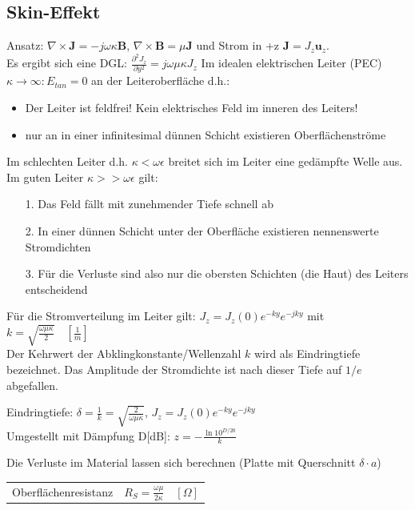 \documentclass[english]{latex4ei/latex4ei_sheet}
\begin{document}
\begin{sectionbox}
\subsection{Skin-Effekt}
Ansatz: $\nabla \times \mathbf{J} = -j\omega\kappa \mathbf{B}$, $\nabla\times\mathbf{B} = \mu \mathbf{J}$ und Strom in +z $\mathbf{J} = J_z \mathbf{u}_z$.\\
Es ergibt sich eine DGL: $\frac{\partial^2 J_z}{\partial y^2} = j\omega \mu \kappa J_z$
Im idealen elektrischen Leiter (PEC) $\kappa \to \infty: E_{tan} = 0$ an der Leiteroberfläche d.h.:\\
\begin{itemize}
	\item Der Leiter ist feldfrei! Kein elektrisches Feld im inneren des Leiters!
	\item nur an in einer infinitesimal dünnen Schicht existieren Oberflächenströme
\end{itemize}
Im schlechten Leiter d.h. $\kappa < \omega\epsilon$ breitet sich im Leiter eine gedämpfte Welle aus.\\
Im guten Leiter $\kappa >> \omega\epsilon$ gilt:
\begin{itemize}
	\item[1.] Das Feld fällt mit zunehmender Tiefe schnell ab
	\item[2.] In einer dünnen Schicht unter der Oberfläche existieren nennenswerte Stromdichten
	\item[3.] Für die Verluste sind also nur die obersten Schichten (die Haut) des Leiters entscheidend
\end{itemize}
Für die Stromverteilung im Leiter gilt: $J_z = J_z(0) e^{-ky} e^{-jky}$ mit $k = \sqrt{\frac{\omega\mu\kappa}{2}}\quad[\frac{1}{m}]$\\
Der Kehrwert der Abklingkonstante/Wellenzahl $k$ wird als Eindringtiefe bezeichnet. Das Amplitude der Stromdichte ist nach dieser Tiefe auf $1/e$ abgefallen.
\begin{emphbox}
Eindringtiefe: $\delta = \frac{1}{k} = \sqrt{\frac{2}{\omega \mu \kappa}}$, $J_z = J_z(0) e^{-ky} e^{-jky}$\\
Umgestellt mit Dämpfung D[dB]: $z = -\frac{\operatorname{ln}10^{D/20}}{k}$
\end{emphbox}
Die Verluste im Material lassen sich berechnen (Platte mit Querschnitt $\delta \cdot a$)\\
\begin{tabular*}{\columnwidth}{ll}
	Oberflächenresistanz & $R_S = \frac{\omega\mu}{2\kappa} \quad [\Omega]$ \\

\end{tabular*}
\end{sectionbox}
\end{document}
